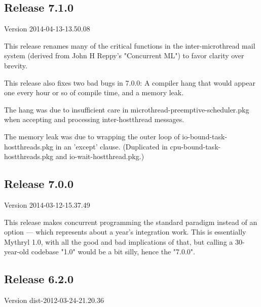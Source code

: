 
\subsection{Release 7.1.0}
\label{section:src:release-7.1.0}

Version 2014-04-13-13.50.08

This release renames many of the critical functions in the inter-microthread 
mail system (derived from John H Reppy's "Concurrent ML") to favor clarity over 
brevity.

This release also fixes two bad bugs in 7.0.0:  A compiler hang that would appear 
one every hour or so of compile time, and a memory leak.

The hang was due to 
insufficient care in microthread-preemptive-scheduler.pkg when accepting and 
processing inter-hostthread messages.

The memory leak was due to wrapping the 
outer loop of io-bound-task-hostthreads.pkg in an 'except' clause. (Duplicated 
in cpu-bound-task-hostthreads.pkg and io-wait-hostthread.pkg.)


\cutend*

\subsection{Release 7.0.0}
\label{section:src:release-7.0.0}

Version 2014-03-12-15.37.49

This release makes concurrent programming the standard paradigm instead 
of an option --- which represents about a year's integration work.  This is essentially 
Mythryl 1.0, with all the good and bad implications of that, but calling a 30-year-old 
codebase "1.0" would be a bit silly, hence the "7.0.0".

\cutend*



\subsection{Release 6.2.0}
\label{section:src:release-6.2.0}

Version dist-2012-03-24-21.20.36

